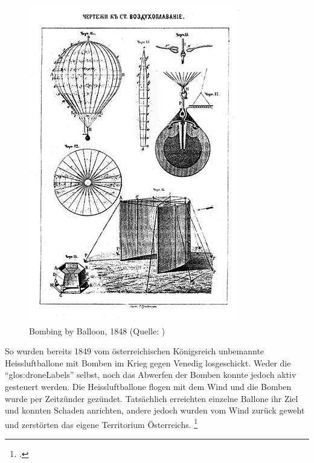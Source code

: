 \begin{figure}
	\includegraphics[width=1.0\linewidth]{images/analysis/balloonbombs1849.jpg}
 	\caption[Bombing by Balloon, 1848]{Bombing by Balloon, 1848 (Quelle: )}
\end{figure}
So wurden bereits 1849 vom österreichischen Königsreich unbemannte Heissluftballone mit Bomben im Krieg gegen Venedig losgeschickt.
Weder die "`\glspl{glos:droneLabel}"' selbst, noch das Abwerfen der Bomben konnte jedoch aktiv gesteuert werden.
Die Heissluftballone flogen mit dem Wind und die Bomben wurde per Zeitzünder gezündet. Tatsächlich erreichten einzelne Ballone ihr Ziel und konnten Schaden anrichten, andere jedoch wurden vom Wind zurück geweht und zerstörten das eigene Territorium Österreichs. \footcite{Remote_Piloted_Aerial_Vehicles_2015-03-21}

